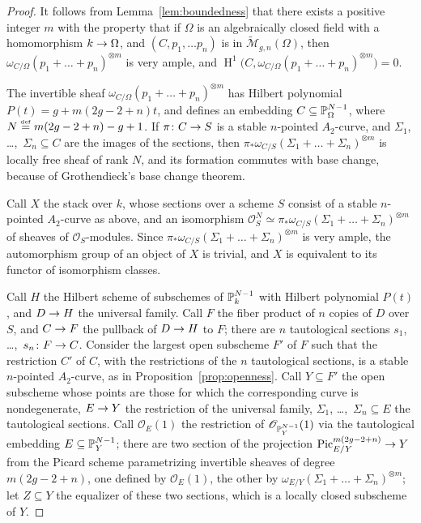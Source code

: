 \documentclass[a4paper, 10pt]{amsart}
\numberwithin{equation}{section}
\numberwithin{subsection}{section}
\theoremstyle{definition}
\theoremstyle{remark}
\renewcommand{\mathcal}{\mathscr}
\newcommand\cO{\mathcal{O}} \newcommand\cP{\mathcal{P}}
\newcommand\arr{\ifinner\to\else\longrightarrow\fi}
\renewcommand\H{\operatorname{H}}
\newcommand{\eqdef}{\mathrel{\smash{\overset{\mathrm{\scriptscriptstyle def}} =}}}
\newcommand\pic{\operatorname{Pic}}
\newcommand{\mt}{\widetilde{\mathcal M}}
\begin{document}
	\begin{proof}
		It follows from Lemma~\ref{lem:boundedness} that there exists a positive integer $m$ with the property that if $\Omega$ is an algebraically closed field with a homomorphism $k \arr \Omega$, and $(C, p_{1}, \dots p_{n})$ is in $\mt_{g,n}(\Omega)$, then $\omega_{C/\Omega}(p_{1}+ \dots + p_{n})^{\otimes m}$ is very ample, and $\H^{1}\bigl(C, \omega_{C/\Omega}(p_{1}+ \dots + p_{n})^{\otimes m}\bigr) = 0$.
		
		The invertible sheaf $\omega_{C/\Omega}(p_{1}+ \dots + p_{n})^{\otimes m}$ has Hilbert polynomial $P(t) = g + m(2g-2 + n)t$, and defines an embedding $C \subseteq \mathbb{P}_{\Omega}^{N-1}$, where $N \eqdef m(2g-2 + n) - g + 1$. If $\pi\colon C \arr S$ is a stable $n$-pointed $A_{2}$-curve, and $\Sigma_{1}$, \dots,~$\Sigma_{n} \subseteq C$ are the images of the sections, then $\pi_{*}\omega_{C/S}(\Sigma_{1}+ \dots + \Sigma_{n})^{\otimes m}$ is locally free sheaf of rank $N$, and its formation commutes with base change, because of Grothendieck's base change theorem.
		
		Call $X$ the stack over $k$, whose sections over a scheme $S$ consist of a stable $n$-pointed $A_{2}$-curve as above, and an isomorphism $\cO_{S}^{N} \simeq \pi_{*}\omega_{C/S}(\Sigma_{1}+ \dots + \Sigma_{n})^{\otimes m}$ of sheaves of $\cO_{S}$-modules. Since $\pi_{*}\omega_{C/S}(\Sigma_{1}+ \dots + \Sigma_{n})^{\otimes m}$ is very ample, the automorphism group of an object of $X$ is trivial, and $X$ is equivalent to its functor of isomorphism classes.
		
		Call $H$ the Hilbert scheme of subschemes of $\mathbb{P}^{N-1}_{k}$ with Hilbert polynomial $P(t)$, and $D \arr H$ the universal family. Call $F$ the fiber product of $n$ copies of $D$ over $S$, and $C \arr F$ the pullback of $D \arr H$ to $F$; there are $n$ tautological sections $s_{1}$, \dots,~$s_{n}\colon F \arr C$. Consider the largest open subscheme $F'$ of $F$ such that the restriction $C'$ of $C$, with the restrictions of the $n$ tautological sections, is a stable $n$-pointed $A_{2}$-curve, as in Proposition~\ref{prop:openness}. Call $Y \subseteq F'$ the open subscheme whose points are those for which the corresponding curve is nondegenerate, $E \arr Y$ the restriction of the universal family, $\Sigma_{1}$, \dots,~$\Sigma_{n} \subseteq E$ the tautological sections. Call $\cO_{E}(1)$ the restriction of $\cO_{\PP^{N-1}_{Y}}(1)$ via the tautological embedding $E \subseteq \mathbb{P}^{N-1}_{Y}$; there are two section of the projection $\pic_{E/Y}^{m(2g-2 + n)}\arr Y$ from the Picard scheme parametrizing invertible sheaves of degree $m(2g-2 + n)$, one defined by $\cO_{E}(1)$, the other by $\omega_{E/Y}(\Sigma_{1} + \dots + \Sigma_{n})^{\otimes m}$; let $Z \subseteq Y$ the equalizer of these two sections, which is a locally closed subscheme of $Y$.
		

\end{proof}
\end{document}
